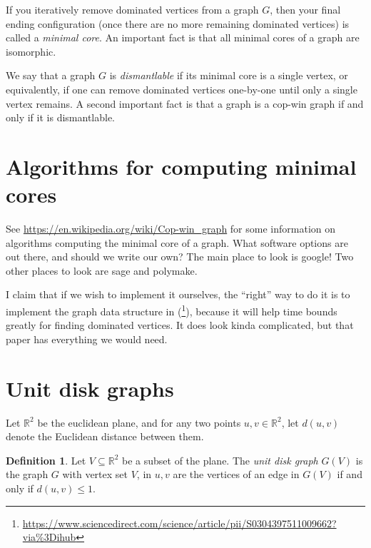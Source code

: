 \documentclass[amscd, amssymb, verbatim]{amsart}[12pt]
\theoremstyle{plain}
\theoremstyle{definition}
\newtheorem{definition}[lemma]{Definition}
\newcommand{\R}{\mathbb{R}}
\begin{document}

If you iteratively remove dominated vertices from a graph $G$, then your final ending configuration (once there are no more remaining dominated vertices) is called a \emph{minimal core}.
An important fact is that all minimal cores of a graph are isomorphic.

We say that a graph $G$ is \emph{dismantlable} if its minimal core is a single vertex, or equivalently, if one can remove dominated vertices one-by-one until only a single vertex remains.
A second important fact is that a graph is a cop-win graph if and only if it is dismantlable.



\section{Algorithms for computing minimal cores}
See \url{https://en.wikipedia.org/wiki/Cop-win\_graph} for some information on algorithms computing the minimal core of a graph.
What software options are out there, and should we write our own?
The main place to look is google!
Two other places to look are sage and polymake.

I claim that if we wish to implement it ourselves, the ``right'' way to do it is to implement the graph data structure in (\footnote{\url{https://www.sciencedirect.com/science/article/pii/S0304397511009662?via\%3Dihub}}), because it will help time bounds greatly for finding dominated vertices.  It does look kinda complicated, but that paper has everything we would need. 



\section{Unit disk graphs}

Let $\R^2$ be the euclidean plane, and for any two points $u,v\in\R^2$, let $d(u,v)$ denote the Euclidean distance between them.

\begin{definition}
Let $V \subseteq \R^2$ be a subset of the plane.
The \emph{unit disk graph} $G(V)$ is the graph $G$ with vertex set $V$, in $u,v$ are the vertices of an edge in $G(V)$ if and only if $d(u,v) \leq 1$.
\end{definition}
\end{document}
